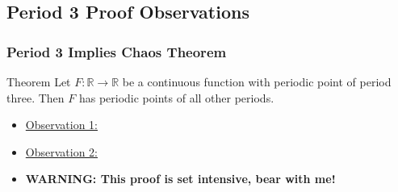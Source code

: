 \documentclass[notes]{beamer}
\begin{document}
\subsection[Theorem and Observations]{Period 3 Proof Observations}


\begin{frame}
\frametitle{Period 3 Implies Chaos Theorem}
\begin{block} {Theorem}
Let  $ F: \mathbb{R} \longrightarrow\mathbb{R}$ be a continuous function with periodic point of period three.  Then $F$ has periodic points of all other periods. 
\end{block}

\begin{itemize}
\item \underline{Observation 1:}
 \item \underline {Observation 2:}
 \item \bf{WARNING:} This proof is set intensive, bear with me!
\end{itemize}

\end{frame}
%
%
%
%
%
% 
\end{document}
